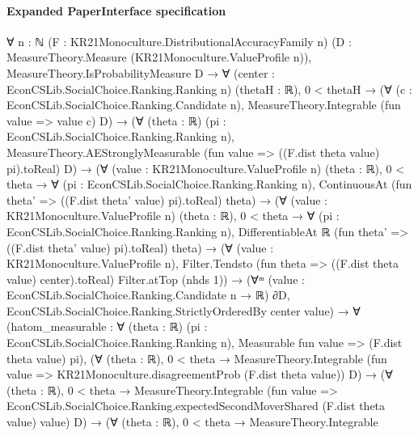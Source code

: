 \documentclass[10pt]{article}
\begin{document}
\paragraph{Expanded PaperInterface specification}
\begin{ReviewVerbatim}
∀ {n : ℕ} (F : KR21Monoculture.DistributionalAccuracyFamily n)
  (D : MeasureTheory.Measure (KR21Monoculture.ValueProfile n)),
  MeasureTheory.IsProbabilityMeasure D →
    ∀ (center : EconCSLib.SocialChoice.Ranking.Ranking n) (thetaH : ℝ),
      0 < thetaH →
        (∀ (c : EconCSLib.SocialChoice.Ranking.Candidate n), MeasureTheory.Integrable (fun value => value c) D) →
          (∀ (theta : ℝ) (pi : EconCSLib.SocialChoice.Ranking.Ranking n),
              MeasureTheory.AEStronglyMeasurable (fun value => ((F.dist theta value) pi).toReal) D) →
            (∀ (value : KR21Monoculture.ValueProfile n) (theta : ℝ),
                0 < theta →
                  ∀ (pi : EconCSLib.SocialChoice.Ranking.Ranking n),
                    ContinuousAt (fun theta' => ((F.dist theta' value) pi).toReal) theta) →
              (∀ (value : KR21Monoculture.ValueProfile n) (theta : ℝ),
                  0 < theta →
                    ∀ (pi : EconCSLib.SocialChoice.Ranking.Ranking n),
                      DifferentiableAt ℝ (fun theta' => ((F.dist theta' value) pi).toReal) theta) →
                (∀ (value : KR21Monoculture.ValueProfile n),
                    Filter.Tendsto (fun theta => ((F.dist theta value) center).toReal) Filter.atTop (nhds 1)) →
                  (∀ᵐ (value : EconCSLib.SocialChoice.Ranking.Candidate n → ℝ) ∂D,
                      EconCSLib.SocialChoice.Ranking.StrictlyOrderedBy center value) →
                    ∀
                      (hatom_measurable :
                        ∀ (theta : ℝ) (pi : EconCSLib.SocialChoice.Ranking.Ranking n),
                          Measurable fun value => (F.dist theta value) pi),
                      (∀ (theta : ℝ),
                          0 < theta →
                            MeasureTheory.Integrable
                              (fun value => KR21Monoculture.disagreementProb (F.dist theta value)) D) →
                        (∀ (theta : ℝ),
                            0 < theta →
                              MeasureTheory.Integrable
                                (fun value =>
                                  EconCSLib.SocialChoice.Ranking.expectedSecondMoverShared (F.dist theta value) value)
                                D) →
                          (∀ (theta : ℝ),
                              0 < theta →
                                MeasureTheory.Integrable

\end{ReviewVerbatim}
\end{document}
